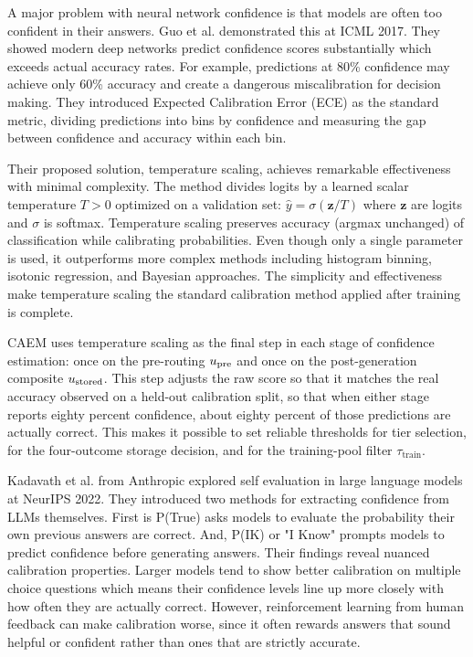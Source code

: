 A major problem with neural network confidence is that models are often too confident in their answers. Guo et al. \cite{pmlr-v70-guo17a} demonstrated this at ICML 2017. They showed modern deep networks predict confidence scores substantially which exceeds actual accuracy rates. For example, predictions at 80\% confidence may achieve only 60\% accuracy and create a  dangerous miscalibration for decision making. They introduced Expected Calibration Error (ECE) as the standard metric, dividing predictions into bins by confidence and measuring the gap between confidence and accuracy within each bin.

Their proposed solution, temperature scaling, achieves remarkable effectiveness with minimal complexity. The method divides logits by a learned scalar temperature $T > 0$ optimized on a validation set: $\hat{y} = \sigma(\mathbf{z}/T)$ where $\mathbf{z}$ are logits and $\sigma$ is softmax. Temperature scaling preserves accuracy (argmax unchanged) of classification while calibrating probabilities. Even though only a single parameter is used, it outperforms more complex methods including histogram binning, isotonic regression, and Bayesian approaches. The simplicity and effectiveness make temperature scaling the standard calibration method applied after training is complete.

CAEM uses temperature scaling as the final step in each stage of confidence estimation: once on the pre-routing $u_{\text{pre}}$ and once on the post-generation composite $u_{\text{stored}}$. This step adjusts the raw score so that it matches the real accuracy observed on a held-out calibration split, so that when either stage reports eighty percent confidence, about eighty percent of those predictions are actually correct. This makes it possible to set reliable thresholds for tier selection, for the four-outcome storage decision, and for the training-pool filter $\tau_{\text{train}}$.

Kadavath et al. \cite{kadavath2022language} from Anthropic explored self evaluation in large language models at NeurIPS 2022. They introduced two methods for extracting confidence from LLMs themselves. First is P(True) asks models to evaluate the probability their own previous answers are correct. And, P(IK) or "I Know" prompts models to predict confidence before generating answers. Their findings reveal nuanced calibration properties. Larger models tend to show better calibration on multiple choice questions which means their confidence levels line up more closely with how often they are actually correct. However, reinforcement learning from human feedback can make calibration worse, since it often rewards answers that sound helpful or confident rather than ones that are strictly accurate.

